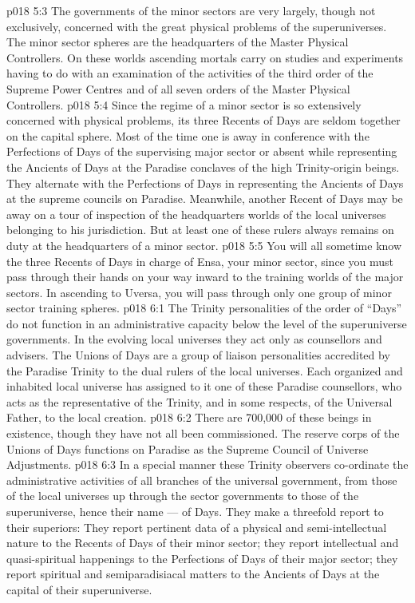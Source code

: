 \vs p018 5:3 The governments of the minor sectors are very largely, though not exclusively, concerned with the great physical problems of the superuniverses. The minor sector spheres are the headquarters of the Master Physical Controllers. On these worlds ascending mortals carry on studies and experiments having to do with an examination of the activities of the third order of the Supreme Power Centres and of all seven orders of the Master Physical Controllers.
\vs p018 5:4 Since the regime of a minor sector is so extensively concerned with physical problems, its three Recents of Days are seldom together on the capital sphere. Most of the time one is away in conference with the Perfections of Days of the supervising major sector or absent while representing the Ancients of Days at the Paradise conclaves of the high Trinity\hyp{}origin beings. They alternate with the Perfections of Days in representing the Ancients of Days at the supreme councils on Paradise. Meanwhile, another Recent of Days may be away on a tour of inspection of the headquarters worlds of the local universes belonging to his jurisdiction. But at least one of these rulers always remains on duty at the headquarters of a minor sector.
\vs p018 5:5 You will all sometime know the three Recents of Days in charge of Ensa, your minor sector, since you must pass through their hands on your way inward to the training worlds of the major sectors. In ascending to Uversa, you will pass through only one group of minor sector training spheres.
\vs p018 6:1 The Trinity personalities of the order of “Days” do not function in an administrative capacity below the level of the superuniverse governments. In the evolving local universes they act only as counsellors and advisers. The Unions of Days are a group of liaison personalities accredited by the Paradise Trinity to the dual rulers of the local universes. Each organized and inhabited local universe has assigned to it one of these Paradise counsellors, who acts as the representative of the Trinity, and in some respects, of the Universal Father, to the local creation.
\vs p018 6:2 There are 700,000 of these beings in existence, though they have not all been commissioned. The reserve corps of the Unions of Days functions on Paradise as the Supreme Council of Universe Adjustments.
\vs p018 6:3 In a special manner these Trinity observers co\hyp{}ordinate the administrative activities of all branches of the universal government, from those of the local universes up through the sector governments to those of the superuniverse, hence their name ---  of Days. They make a threefold report to their superiors: They report pertinent data of a physical and semi\hyp{}intellectual nature to the Recents of Days of their minor sector; they report intellectual and quasi\hyp{}spiritual happenings to the Perfections of Days of their major sector; they report spiritual and semiparadisiacal matters to the Ancients of Days at the capital of their superuniverse.
